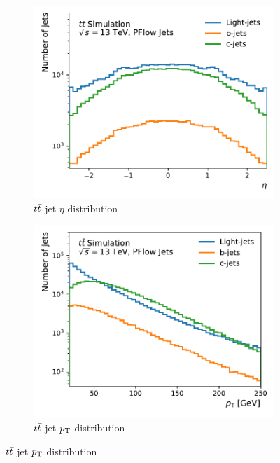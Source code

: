 \begin{figure}
    \centering
    \begin{subfigure}[b]{0.49\textwidth}
        \centering
        \includegraphics[width=\textwidth]{figures/flavour_tagging/ttbar_0.pdf}
        \caption{$t\bar{t}$ jet $\eta$ distribution}
        \label{fig:ttbar_eta}
    \end{subfigure}
    \begin{subfigure}[b]{0.49\textwidth}
        \centering
        \includegraphics[width=\textwidth]{figures/flavour_tagging/ttbar_1.pdf}
        \caption{$t\bar{t}$ jet $p_{\text{T}}$ distribution}
        \label{fig:ttbar_pt}

\end{subfigure}
\end{figure}
